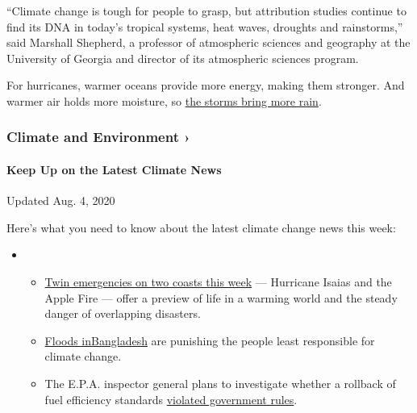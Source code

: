 ``Climate change is tough for people to grasp, but attribution studies
continue to find its DNA in today's tropical systems, heat waves,
droughts and rainstorms,'' said Marshall Shepherd, a professor of
atmospheric sciences and geography at the University of Georgia and
director of its atmospheric sciences program.

For hurricanes, warmer oceans provide more energy, making them stronger.
And warmer air holds more moisture, so
\href{https://www.nytimes3xbfgragh.onion/2019/07/11/climate/hurricane-tropical-storms.html}{the
storms bring more rain}.

\href{https://www.nytimes3xbfgragh.onion/section/climate?action=click\&pgtype=Article\&state=default\&region=MAIN_CONTENT_1\&context=storylines_keepup}{}

\hypertarget{climate-and-environment-}{%
\subsubsection{Climate and Environment
›}\label{climate-and-environment-}}

\hypertarget{keep-up-on-the-latest-climate-news}{%
\paragraph{Keep Up on the Latest Climate
News}\label{keep-up-on-the-latest-climate-news}}

Updated Aug. 4, 2020

Here's what you need to know about the latest climate change news this
week:

\begin{itemize}
\item
  \begin{itemize}
  \tightlist
  \item
    \href{https://www.nytimes3xbfgragh.onion/2020/08/04/climate/hurricane-isaias-apple-fire-climate.html?action=click\&pgtype=Article\&state=default\&region=MAIN_CONTENT_1\&context=storylines_keepup}{Twin
    emergencies on two coasts this week} --- Hurricane Isaias and the
    Apple Fire --- offer a preview of life in a warming world and the
    steady danger of overlapping disasters.
  \item
    \href{https://www.nytimes3xbfgragh.onion/2020/07/30/climate/bangladesh-floods.html?action=click\&pgtype=Article\&state=default\&region=MAIN_CONTENT_1\&context=storylines_keepup}{Floods
    in}\href{https://www.nytimes3xbfgragh.onion/2020/07/30/climate/bangladesh-floods.html?action=click\&pgtype=Article\&state=default\&region=MAIN_CONTENT_1\&context=storylines_keepup}{Bangladesh}
    are punishing the people least responsible for climate change.
  \item
    The E.P.A. inspector general plans to investigate whether a rollback
    of fuel efficiency standards
    \href{https://www.nytimes3xbfgragh.onion/2020/07/27/climate/trump-fuel-efficiency-rule.html?action=click\&pgtype=Article\&state=default\&region=MAIN_CONTENT_1\&context=storylines_keepup}{violated
    government rules}.
  \end{itemize}
\end{itemize}

